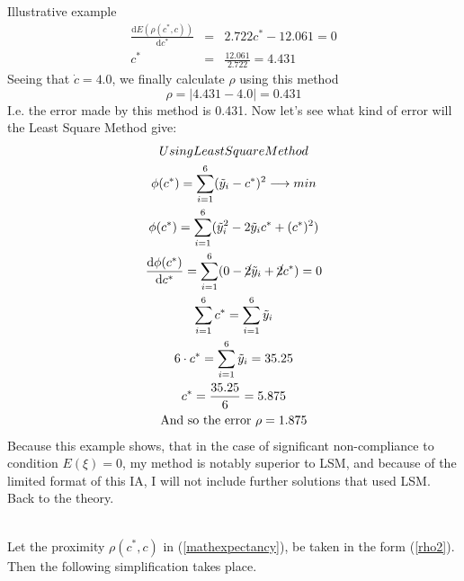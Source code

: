 \documentclass[11pt,a4paper]{article}
\numberwithin{equation}{subsection}
\begin{document}
\begin{subsection}{Illustrative example}
\begin{eqnarray*}
\frac{\mathrm{d}E(\rho(c^{*},c))}{\mathrm{d}c^{*}} &=& 2.722c^{*}-12.061 = 0 \\
c^{*} &=& \frac{12.061}{2.722} = 4.431
\end{eqnarray*}
Seeing that $\dot{c} = 4.0$, we finally calculate $\rho$ using this method
\begin{equation*}
\rho = |4.431-4.0| = 0.431
\end{equation*}
I.e. the error made by this method is 0.431. Now let's see what kind of error will the Least Square Method give:
\begin{gather*}
Using Least Square Method \\
\phi(c^{*})= \sum\limits_{i=1}^{6}(\tilde{y}_{i}-c^{*})^{2} \longrightarrow min \\
\phi(c^{*})= \sum\limits_{i=1}^{6}(\tilde{y}_{i}^{2}-2 \tilde{y}_{i}c^{*} + (c^{*})^{2}) \\
\frac{\mathrm{d}\phi(c^{*})}{\mathrm{d}c^{*}} =  \sum\limits_{i=1}^{6}(0 -\cancel{2} \tilde{y}_{i} +\cancel{2} c^{*}) = 0 \\
\sum\limits_{i=1}^{6}c^{*} = \sum\limits_{i=1}^{6} \tilde{y}_{i} \\
6 \cdot c^{*} = \sum\limits_{i=1}^{6} \tilde{y}_{i} = 35.25 \\
c^{*} = \frac{35.25}{6} = 5.875 \\
\text{And so the error } \rho = 1.875
\end{gather*}
Because this example shows, that in the case of significant non-compliance to condition $E(\xi)=0$, my method is notably superior to LSM, and because of the limited format of this IA, I will not include further solutions that used LSM. %
 Back to the theory.\\
\\
\end{subsection}
Let the proximity $\rho(c^{*},c)$ in (\ref{mathexpectancy}), be taken in the form (\ref{rho2}). Then the following simplification takes place.
\end{document}
